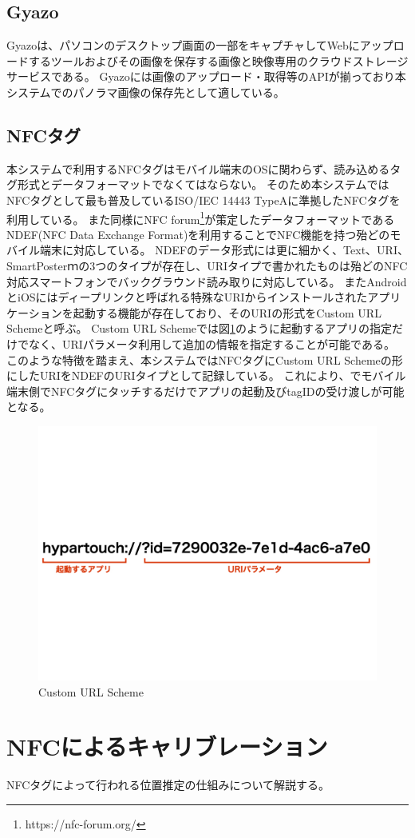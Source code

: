 \subsection{Gyazo}
Gyazoは、パソコンのデスクトップ画面の一部をキャプチャしてWebにアップロードするツールおよびその画像を保存する画像と映像専用のクラウドストレージサービスである。
Gyazoには画像のアップロード・取得等のAPIが揃っており本システムでのパノラマ画像の保存先として適している。

\subsection{NFCタグ}
本システムで利用するNFCタグはモバイル端末のOSに関わらず、読み込めるタグ形式とデータフォーマットでなくてはならない。
そのため本システムではNFCタグとして最も普及しているISO/IEC 14443 TypeAに準拠したNFCタグを利用している。
また同様にNFC forum\footnote{\textsf{https://nfc-forum.org/}}が策定したデータフォーマットであるNDEF(NFC Data Exchange Format)を利用することでNFC機能を持つ殆どのモバイル端末に対応している。
NDEFのデータ形式には更に細かく、Text、URI、SmartPosterｍの3つのタイプが存在し、URIタイプで書かれたものは殆どのNFC対応スマートフォンでバックグラウンド読み取りに対応している。
またAndroidとiOSにはディープリンクと呼ばれる特殊なURIからインストールされたアプリケーションを起動する機能が存在しており、そのURIの形式をCustom URL Schemeと呼ぶ。
Custom URL Schemeでは図\ref{fig:custom_url_scheme}のように起動するアプリの指定だけでなく、URIパラメータ利用して追加の情報を指定することが可能である。
このような特徴を踏まえ、本システムではNFCタグにCustom URL Schemeの形にしたURIをNDEFのURIタイプとして記録している。
これにより、でモバイル端末側でNFCタグにタッチするだけでアプリの起動及びtagIDの受け渡しが可能となる。


\begin{figure}[h]
  \centering
  \includegraphics[width=150mm]{images/custom_url_scheme.jpg}
  \caption{Custom URL Scheme} \label{fig:custom_url_scheme}
\end{figure}


\section{NFCによるキャリブレーション}
NFCタグによって行われる位置推定の仕組みについて解説する。
